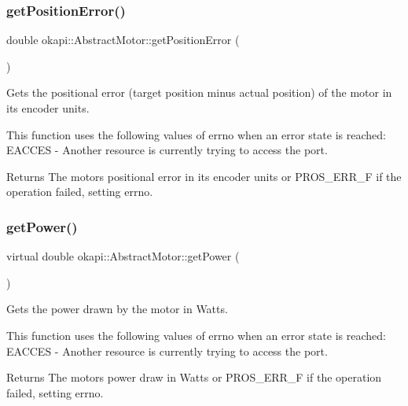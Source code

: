 \mbox{\label{classokapi_1_1AbstractMotor_aaef41096c3a80f319f8fd42321726310}} 
\subsubsection{\texorpdfstring{getPositionError()}{getPositionError()}}
{\footnotesize\ttfamily double okapi\+::\+Abstract\+Motor\+::get\+Position\+Error (\begin{DoxyParamCaption}{ }\end{DoxyParamCaption})}

Gets the positional error (target position minus actual position) of the motor in its encoder units.

This function uses the following values of errno when an error state is reached\+: E\+A\+C\+C\+ES -\/ Another resource is currently trying to access the port.

\begin{DoxyReturn}{Returns}
The motor\textquotesingle{}s positional error in its encoder units or P\+R\+O\+S\+\_\+\+E\+R\+R\+\_\+F if the operation failed, setting errno. 
\end{DoxyReturn}
\mbox{\label{classokapi_1_1AbstractMotor_aed423ac40cec85c5880f7954b6d810fe}} 
\subsubsection{\texorpdfstring{getPower()}{getPower()}}
{\footnotesize\ttfamily virtual double okapi\+::\+Abstract\+Motor\+::get\+Power (\begin{DoxyParamCaption}{ }\end{DoxyParamCaption})\hspace{0.3cm}{\ttfamily [pure virtual]}}

Gets the power drawn by the motor in Watts.

This function uses the following values of errno when an error state is reached\+: E\+A\+C\+C\+ES -\/ Another resource is currently trying to access the port.

\begin{DoxyReturn}{Returns}
The motor\textquotesingle{}s power draw in Watts or P\+R\+O\+S\+\_\+\+E\+R\+R\+\_\+F if the operation failed, setting errno. 
\end{DoxyReturn}



